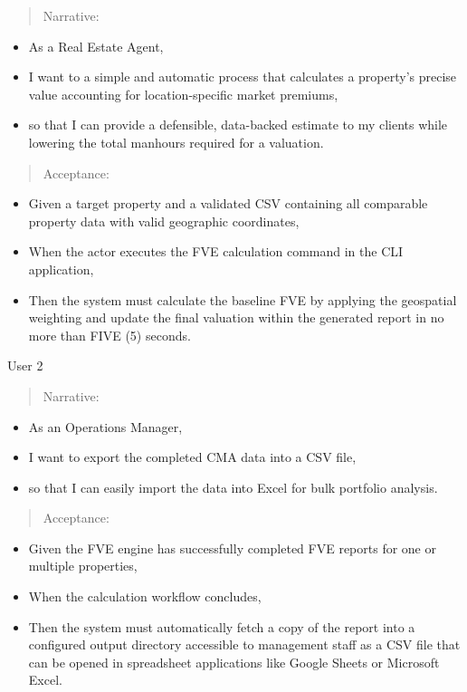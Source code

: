 \documentclass[
]{article}
\begin{document}
\begin{quote}
Narrative:
\end{quote}

\begin{itemize}
\item
  As a Real Estate Agent,
\item
  I want to a simple and automatic process that calculates a property's
  precise value accounting for location-specific market premiums,
\item
  so that I can provide a defensible, data-backed estimate to my clients
  while lowering the total manhours required for a valuation.
\end{itemize}

\begin{quote}
Acceptance:
\end{quote}

\begin{itemize}
\item
  Given a target property and a validated CSV containing all comparable
  property data with valid geographic coordinates,
\item
  When the actor executes the FVE calculation command in the CLI
  application,
\item
  Then the system must calculate the baseline FVE by applying the
  geospatial weighting and update the final valuation within the
  generated report in no more than FIVE (5) seconds.
\end{itemize}

User 2

\begin{quote}
Narrative:
\end{quote}

\begin{itemize}
\item
  As an Operations Manager,
\item
  I want to export the completed CMA data into a CSV file,
\item
  so that I can easily import the data into Excel for bulk portfolio
  analysis.
\end{itemize}

\begin{quote}
Acceptance:
\end{quote}

\begin{itemize}
\item
  Given the FVE engine has successfully completed FVE reports for one or
  multiple properties,
\item
  When the calculation workflow concludes,
\item
  Then the system must automatically fetch a copy of the report into a
  configured output directory accessible to management staff as a CSV
  file that can be opened in spreadsheet applications like Google Sheets
  or Microsoft Excel.
\end{itemize}
\end{document}
